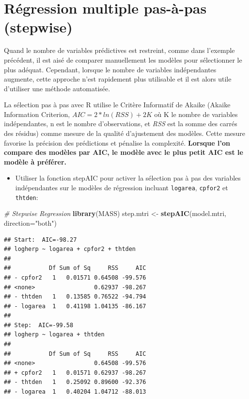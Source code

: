 \documentclass[12pt,]{book}
\newenvironment{Shaded}{\begin{snugshade}}{\end{snugshade}}
\newcommand{\CommentTok}[1]{\textcolor[rgb]{0.56,0.35,0.01}{\textit{#1}}}
\newcommand{\DataTypeTok}[1]{\textcolor[rgb]{0.13,0.29,0.53}{#1}}
\newcommand{\KeywordTok}[1]{\textcolor[rgb]{0.13,0.29,0.53}{\textbf{#1}}}
\newcommand{\NormalTok}[1]{#1}
\newcommand{\StringTok}[1]{\textcolor[rgb]{0.31,0.60,0.02}{#1}}
\providecommand{\tightlist}{%
  \setlength{\itemsep}{0pt}\setlength{\parskip}{0pt}}
\begin{document}
\hypertarget{ruxe9gression-multiple-pas-uxe0-pas-stepwise}{%
\section{Régression multiple pas-à-pas (stepwise)}\label{ruxe9gression-multiple-pas-uxe0-pas-stepwise}}

Quand le nombre de variables prédictives est restreint, comme dans l'exemple précédent, il est aisé de comparer manuellement les modèles pour sélectionner le plus adéquat. Cependant, lorsque le nombre de variables indépendantes augmente, cette approche n'est rapidement plus utilisable et il est alors utile d'utiliser une méthode automatisée.

La sélection pas à pas avec R utilise le Critère Informatif de Akaike (Akaike Information Criterion, \(AIC = 2* ln(RSS) + 2K\) où K le nombre de variables indépendantes, n est le nombre d'observations, et \emph{RSS} est la somme des carrés des résidus) comme mesure de la qualité d'ajustement des modèles. Cette mesure favorise la précision des prédictions et pénalise la complexité. \textbf{Lorsque l'on compare des modèles par AIC, le modèle avec le plus petit AIC est le modèle à préférer.}

\begin{itemize}
\tightlist
\item
  Utiliser la fonction stepAIC pour activer la sélection pas à pas des variables indépendantes sur le modèles de régression incluant \texttt{logarea}, \texttt{cpfor2} et \texttt{thtden}:
\end{itemize}

\begin{Shaded}
\begin{Highlighting}[]
\CommentTok{# Stepwise Regression}
\KeywordTok{library}\NormalTok{(MASS)}
\NormalTok{step.mtri <-}\StringTok{ }\KeywordTok{stepAIC}\NormalTok{(model.mtri, }\DataTypeTok{direction=}\StringTok{"both"}\NormalTok{)}
\end{Highlighting}
\end{Shaded}

\begin{verbatim}
## Start:  AIC=-98.27
## logherp ~ logarea + cpfor2 + thtden
## 
##           Df Sum of Sq     RSS     AIC
## - cpfor2   1   0.01571 0.64508 -99.576
## <none>                 0.62937 -98.267
## - thtden   1   0.13585 0.76522 -94.794
## - logarea  1   0.41198 1.04135 -86.167
## 
## Step:  AIC=-99.58
## logherp ~ logarea + thtden
## 
##           Df Sum of Sq     RSS     AIC
## <none>                 0.64508 -99.576
## + cpfor2   1   0.01571 0.62937 -98.267
## - thtden   1   0.25092 0.89600 -92.376
## - logarea  1   0.40204 1.04712 -88.013
\end{verbatim}
\end{document}
